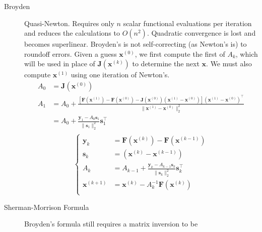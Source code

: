\documentclass[8pt]{article}
\begin{document}
\begin{multicols}{2}
\begin{description}

  \item[Broyden] Quasi-Newton. Requires only $n$ scalar functional evaluations per iteration and
    reduces the calculations to $O(n^2)$. Quadratic convergence is lost and becomes
    superlinear. Broyden's is not self-correcting (as Newton's is) to roundoff errors. Given a
    guess $\mathbf{x}^{(0)}$, we first compute the first of $A_{k}$, which will be used in place
    of $\mathbf{J}(\mathbf{x}^{(k)})$ to determine the next $\mathbf{x}$. We must also compute
    $\mathbf{x}^{(1)}$ using one iteration of Newton's.
    \begin{equation*}
      \begin{aligned}
        A_0&=\mathbf{J}(\mathbf{x}^{(0)}) \\
        A_1&=A_0+\frac{[\mathbf{F}(\mathbf{x}^{(1)}) -
          \mathbf{F}(\mathbf{x}^{(0)}) -
          \mathbf{J}(\mathbf{x}^{(0)})(\mathbf{x}^{(1)}-\mathbf{x}^{(0)})](\mathbf{x}^{(1)}-\mathbf{x}^{(0)})^\top}{\|\mathbf{x}^{(1)}-\mathbf{x}^{(0)}\|^2_2} \\
        &=A_0+\frac{\mathbf{y}_1-A_{0}\mathbf{s}_1}{\|\mathbf{s}_1\|^2_2}\mathbf{s}_1^\top \\
      \end{aligned}
    \end{equation*}
    \begin{equation*}
      \left\{
        \begin{aligned}
          \mathbf{y}_k&=\mathbf{F}(\mathbf{x}^{(k)})-\mathbf{F}(\mathbf{x}^{(k-1)}) \\
          \mathbf{s}_k&=(\mathbf{x}^{(k)}-\mathbf{x}^{(k-1)}) \\
          A_k&=A_{k-1}+\frac{\mathbf{y}_k-A_{k-1}\mathbf{s}_k}{\|\mathbf{s}_k\|^2_2}\mathbf{s}_k^\top \\
          \mathbf{x}^{(k+1)}&=\mathbf{x}^{(k)}-A_k^{-1}\mathbf{F}(\mathbf{x}^{(k)}) \\
        \end{aligned}
      \right.
    \end{equation*}
  \item[Sherman-Morrison Formula] Broyden's formula still requires a matrix inversion to be

\end{description}
\end{multicols}
\end{document}
